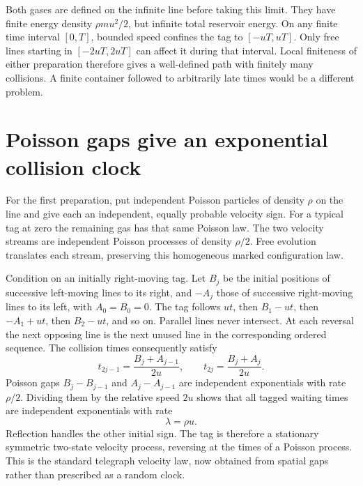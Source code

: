 \documentclass[11pt,a4paper]{article}
\begin{document}
Both gases are defined on the infinite line before taking this limit. They
have finite energy density $\rho m u^2/2$, but infinite total reservoir energy.
On any finite time interval $[0,T]$, bounded speed confines the tag to
$[-uT,uT]$. Only free lines starting in $[-2uT,2uT]$ can affect it during that
interval. Local finiteness of either preparation therefore gives a well-defined
path with finitely many collisions. A finite container followed to arbitrarily
late times would be a different problem.

\section{Poisson gaps give an exponential collision clock}
For the first preparation, put independent Poisson particles of density $\rho$
on the line and give each an independent, equally probable velocity sign.
For a typical tag at zero the remaining gas has that same Poisson law.
The two velocity streams are independent Poisson processes of density
$\rho/2$. Free evolution translates each stream, preserving this homogeneous
marked configuration law.

Condition on an initially right-moving tag. Let $B_j$ be the initial positions
of successive left-moving lines to its right, and $-A_j$ those of successive
right-moving lines to its left, with $A_0=B_0=0$.
The tag follows $ut$, then $B_1-ut$, then $-A_1+ut$, then $B_2-ut$, and so on.
Parallel lines never intersect. At each reversal the next opposing line is
the next unused line in the corresponding ordered sequence. The collision
times consequently satisfy
\begin{equation}
 t_{2j-1}=\frac{B_j+A_{j-1}}{2u},\qquad
 t_{2j}=\frac{B_j+A_j}{2u}. \label{eq:times}
\end{equation}
Poisson gaps $B_j-B_{j-1}$ and $A_j-A_{j-1}$ are independent exponentials
with rate $\rho/2$. Dividing them by the relative speed $2u$ shows that all
tagged waiting times are independent exponentials with rate
\begin{equation}
 \lambda=\rho u. \label{eq:rate}
\end{equation}
Reflection handles the other initial sign. The tag is therefore a stationary
symmetric two-state velocity process, reversing at the times of a Poisson
process. This is the standard telegraph velocity law, now obtained from
spatial gaps rather than prescribed as a random clock.
\end{document}
